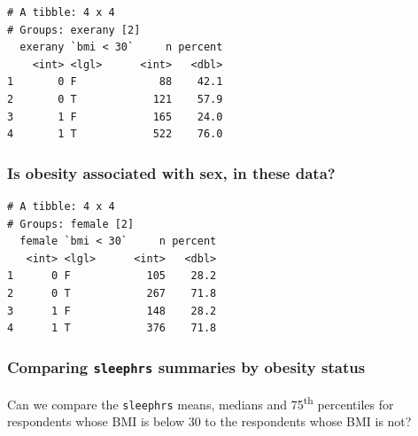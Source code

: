 \documentclass[]{book}
\newenvironment{Shaded}{\begin{snugshade}}{\end{snugshade}}
\newcommand{\KeywordTok}[1]{\textcolor[rgb]{0.13,0.29,0.53}{\textbf{#1}}}
\newcommand{\DataTypeTok}[1]{\textcolor[rgb]{0.13,0.29,0.53}{#1}}
\newcommand{\DecValTok}[1]{\textcolor[rgb]{0.00,0.00,0.81}{#1}}
\newcommand{\FloatTok}[1]{\textcolor[rgb]{0.00,0.00,0.81}{#1}}
\newcommand{\StringTok}[1]{\textcolor[rgb]{0.31,0.60,0.02}{#1}}
\newcommand{\OperatorTok}[1]{\textcolor[rgb]{0.81,0.36,0.00}{\textbf{#1}}}
\newcommand{\NormalTok}[1]{#1}
\theoremstyle{definition}
\theoremstyle{definition}
\theoremstyle{definition}
\theoremstyle{remark}
\begin{document}
\begin{verbatim}
# A tibble: 4 x 4
# Groups: exerany [2]
  exerany `bmi < 30`     n percent
    <int> <lgl>      <int>   <dbl>
1       0 F             88    42.1
2       0 T            121    57.9
3       1 F            165    24.0
4       1 T            522    76.0
\end{verbatim}

\subsubsection{Is obesity associated with sex, in these
data?}\label{is-obesity-associated-with-sex-in-these-data}

\begin{Shaded}
\end{Shaded}

\begin{verbatim}
# A tibble: 4 x 4
# Groups: female [2]
  female `bmi < 30`     n percent
   <int> <lgl>      <int>   <dbl>
1      0 F            105    28.2
2      0 T            267    71.8
3      1 F            148    28.2
4      1 T            376    71.8
\end{verbatim}

\subsubsection{\texorpdfstring{Comparing \texttt{sleephrs} summaries by
obesity
status}{Comparing sleephrs summaries by obesity status}}\label{comparing-sleephrs-summaries-by-obesity-status}

Can we compare the \texttt{sleephrs} means, medians and
75\textsuperscript{th} percentiles for respondents whose BMI is below 30
to the respondents whose BMI is not?

\begin{Shaded}
\end{Shaded}
\end{document}
